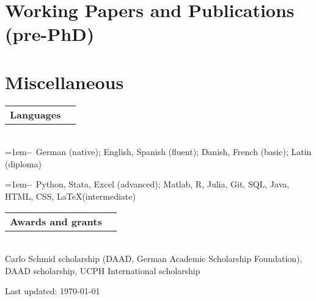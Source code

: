 \documentclass[a4paper,11pt]{article}
\makeatletter
\newcommand{\Subheading}[4]{   
    \begin{tabular*}{\textwidth}[t]{@{}l@{\extracolsep{\fill}}r@{}}
        \textbf{#1}\textit{\small #2} & {\footnotesize #3} \\
    \end{tabular*}
    {\small #4}
    \vspace{7pt}
}
\newcommand{\myitem}[1]{\hangindent=1em\hangafter=1\textbf{--}~#1\par}
\makeatother
\begin{document}
\newpage

\section{Working Papers and Publications (pre-PhD)}
\vspace{3pt}
\setlength{\bibitemsep}{1.4ex}
\begin{refsection}
\nocite{*}
\printbibliography[heading=none]
\end{refsection}

\section{Miscellaneous}

\Subheading
    {Languages}{}{}
    {\\
    \myitem{German (native); English, Spanish (fluent); Danish, French (basic); Latin (diploma)}
    \myitem{Python, Stata, Excel (advanced); Matlab, R, Julia, Git, SQL, Java, HTML, CSS, \LaTeX\space(intermediate)}
    }

\Subheading
    {Awards and grants}{}{}
    {\\
    Carlo Schmid scholarship (DAAD, German Academic Scholarship Foundation), DAAD scholarship, UCPH International scholarship
    } 

\vfill
\begin{center}
{\footnotesize Last updated: \today}
\end{center}
\end{document}
